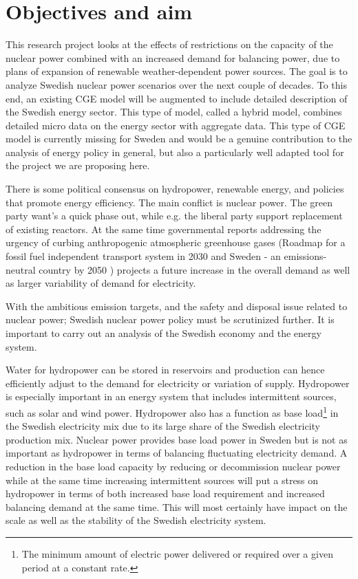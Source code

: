 \section{Objectives and aim}
This research project looks at the effects of restrictions on the capacity of the nuclear power combined with an increased demand for balancing power, due to plans of expansion of renewable weather-dependent power sources. The goal is to analyze Swedish nuclear power scenarios over the next couple of decades. To this end, an existing CGE model will be augmented to include detailed description of the Swedish energy sector. This type of model, called a hybrid model, combines detailed micro data on the energy sector with aggregate data. This type of CGE model is currently missing for Sweden and would be a genuine contribution to the analysis of energy policy in general, but also a particularly well adapted tool for the project we are proposing here.

There is some political consensus on hydropower, renewable energy, and policies that promote energy efficiency. The main conflict is nuclear power. The green party want's a quick phase out, while e.g. the liberal party support replacement of existing reactors. At the same time governmental reports addressing the urgency of curbing anthropogenic atmospheric greenhouse gases (Roadmap for a fossil fuel independent transport system in 2030 \cite{SOU201384} and Sweden - an emissions-neutral country by 2050 \cite{sepa2012}) projects a future increase in the overall demand as well as larger variability of demand for electricity.

With the ambitious emission targets, and the safety and disposal issue related to nuclear power; Swedish nuclear power policy must be scrutinized further. It is important to carry out an analysis of the Swedish economy and the energy system.

Water for hydropower can be stored in reservoirs and production can hence efficiently adjust to the demand for electricity or variation of supply. Hydropower is especially important in an energy system that includes intermittent sources, such as solar and wind power. Hydropower also has a function as base load\footnote{The minimum amount of electric power delivered or required over a given period at a constant rate.} in the Swedish electricity mix due to its large share of the Swedish electricity production mix. Nuclear power provides base load power in Sweden but is not as important as hydropower in terms of balancing fluctuating electricity demand. A reduction in the base load capacity by reducing or decommission nuclear power while at the same time increasing intermittent sources will put a stress on hydropower in terms of both increased base load requirement and increased balancing demand at the same time. This will most certainly have impact on the scale as well as the stability of the Swedish electricity system.

